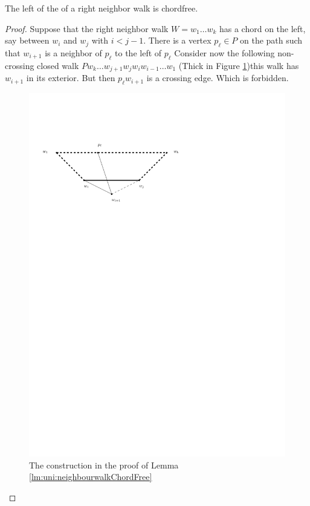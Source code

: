   \begin{lemma}
    \label{lm:uni:neighbourwalkChordFree}
    The left of the of a right neighbor walk is chordfree.
  \end{lemma}
  \begin{proof}
    Suppose that the right neighbor walk $W = w_1 \ldots w_k$  has a chord on the left, say between $w_i$ and $w_j$ with $i< j -1 $. There is a vertex $p_\ell \in P$ on the path such that $w_{i+1}$ is a neighbor of $p_\ell$ to the left of $p_\ell$ Consider now the following non-crossing closed walk $P w_k \ldots w_{j+1} w_j w_i w_{i-1} \ldots w_1$
    (Thick in Figure \ref{fig:uni:neihbourwalkChordFree})this walk has $w_{i+1}$ in its exterior. But then $p_\ell w_{i+1}$ is a crossing edge. Which is forbidden.

    \begin{figure}[h]
      \centering
      \includegraphics[scale=1]{unifiedAlgo/img/neighbourWalkChords}
      \caption{The construction in the proof of Lemma \ref{lm:uni:neighbourwalkChordFree}}
      \label{fig:uni:neihbourwalkChordFree}
    \end{figure}
  \end{proof}

